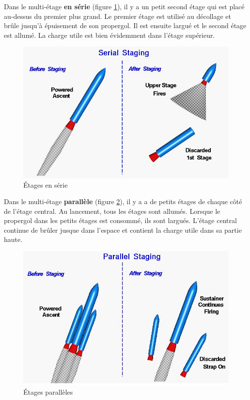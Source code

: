 \documentclass{report}
\begin{document}
Dans le multi-étage \textbf{en série} (figure \ref{54}), il y a un petit second étage qui est placé au-dessus du premier plus grand. Le premier étage est utilisé au décollage et brûle jusqu'à épuisement de son propergol. Il est ensuite largué et le second étage est allumé. La charge utile est bien évidemment dans l'étage supérieur.

\begin{figure}[h!]
    \centering
    \includegraphics[scale=0.4]{54}
    \caption{Étages en série}
    \label{54}
\end{figure}

Dans le multi-étage \textbf{parallèle} (figure \ref{55}), il y a a de petits étages de chaque côté de l'étage central. Au lancement, tous les étages sont allumés. Lorsque le propergol dans les petits étages est consommé, ils sont largués. L'étage central continue de brûler jusque dans l'espace et contient la charge utile dans sa partie haute.

\begin{figure}[h!]
    \centering
    \includegraphics[scale=0.4]{55}
    \caption{Étages parallèles}
    \label{55}
\end{figure}
\end{document}
